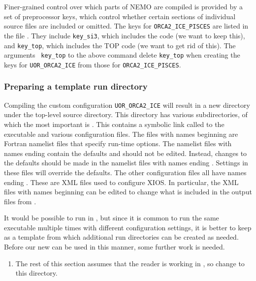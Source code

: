 Finer-grained control over which parts of NEMO are compiled is provided by a set of preprocessor keys, which control whether certain sections of individual source files are included or omitted.
The keys for \mbox{\texttt{ORCA2_ICE_PISCES}} are listed in the file .
They include \mbox{\texttt{key_si3}}, which includes the \SIcu{} code (we want to keep this), and \mbox{\texttt{key_top}}, which includes the TOP code (we want to get rid of this).
The arguments \texttt{ key_top} to the above command delete \texttt{key_top} when creating the keys for \mbox{\texttt{UOR_ORCA2_ICE}} from those for \mbox{\texttt{ORCA2_ICE_PISCES}}.


\subsubsection{Preparing a template run directory}
\label{sec:tutor-template}

Compiling the custom configuration \mbox{\texttt{UOR_ORCA2_ICE}} will result in a new directory  under the top-level source directory.
This directory has various subdirectories, of which the most important is .
This contains a symbolic link called  to the \NEMOSIcu{} executable and various configuration files.
The files with names beginning  are Fortran namelist files that specify run-time options.
The namelist files with names ending  contain the defaults and should not be edited.
Instead, changes to the defaults should be made in the namelist files with names ending .
Settings in these files will override the defaults.
The other configuration files all have names ending .
These are XML files used to configure XIOS.
In particular, the XML files with names beginning  can be edited to change what is included in the output files from \NEMOSIcu{}.

It would be possible to run \NEMOSIcu{} in , but since it is common to run the same executable multiple times with different configuration settings, it is better to keep  as a template from which additional run directories can be created as needed.
Before our new  can be used in this manner, some further work is needed.

\begin{enumerate}
    \item The rest of this section assumes that the reader is working in \linebreak{}, so change to this directory.
\end{enumerate}


